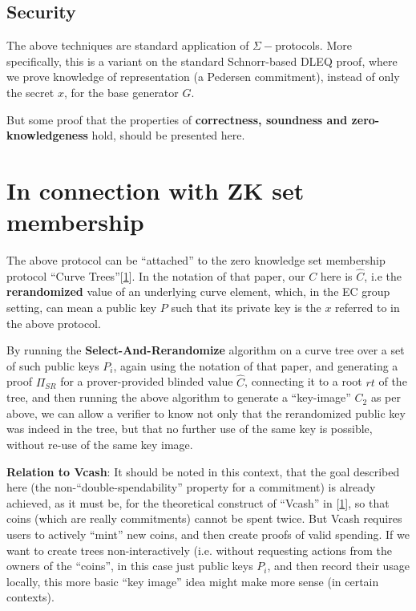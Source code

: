 \documentclass[10pt,a4paper]{article}
\begin{document}
\subsection{Security}
The above techniques are standard application of $\Sigma-$protocols. More specifically, this is a variant on the standard Schnorr-based DLEQ proof, where we prove knowledge of representation (a Pedersen commitment), instead of only the secret $x$, for the base generator $G$.

But some proof that the properties of \textbf{correctness, soundness and zero-knowledgeness} hold, should be presented here.

\section{In connection with ZK set membership}

The above protocol can be ``attached'' to the zero knowledge set membership protocol ``Curve Trees''{[}\protect\hyperlink{anchor-1}{1}{]}. In the notation of that paper, our $C$ here is $\hat{C}$, i.e the \textbf{rerandomized} value of an underlying curve element, which, in the EC group setting, can mean a public key $P$ such that its private key is the $x$ referred to in the above protocol.

By running the \textbf{Select-And-Rerandomize} algorithm on a curve tree over a set of such public keys ${P_i}$, again using the notation of that paper, and generating a proof $\Pi_{SR}$ for a prover-provided blinded value $\hat{C}$, connecting it to a root $rt$ of the tree, and then running the above algorithm to generate a ``key-image'' $C_2$ as per above, we can allow a verifier to know not only that the rerandomized public key was indeed in the tree, but that no further use of the same key is possible, without re-use of the same key image.

\textbf{Relation to Vcash}: It should be noted in this context, that the goal described here (the non-``double-spendability'' property for a commitment) is already achieved, as it must be, for the theoretical construct of ``Vcash'' in {[}\protect\hyperlink{anchor-1}{1}{]}, so that coins (which are really commitments) cannot be spent twice. But Vcash requires users to actively ``mint'' new coins, and then create proofs of valid spending. If we want to create trees non-interactively (i.e. without requesting actions from the owners of the ``coins'', in this case just public keys $P_i$, and then record their usage locally, this more basic ``key image'' idea might make more sense (in certain contexts).
\end{document}
